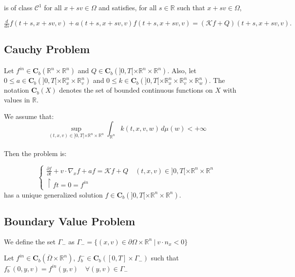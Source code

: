 \documentclass[onecolumn, 12pt, a4paper]{article}
\begin{document}
	is of class $\mathcal{C}^1$ for all $x+sv \in \Omega$ and satisfies, for all $s \in \mathbb{R}$ such that $x +sv \in \Omega$,
	
	$\frac{d}{ds}f(t+s,x+sv,v) +a(t+s,x+sv,v)f(t+s,x+sv,v) = (\mathcal{K}f+ Q)(t+s,x+sv,v).$
	
	\subsection{Cauchy Problem}
	\paragraph{}
	
	
	
	Let $f^{in} \in \mathbf{C}_b(\mathbb{R}^n \times \mathbb{R}^n)$ and $Q \in \mathbf{C}_b(]0,T[ \times \mathbb{R}^n \times \mathbb{R}^n)$. Also, let $0 \leq a \in \mathbf{C}_b(]0,T[ \times \mathbb{R}_x^n \times \mathbb{R}_v^n)$ and $0 \leq k \in \mathbf{C}_b(]0,T[ \times \mathbb{R}_x^n \times \mathbb{R}_v^n \times \mathbb{R}_w^n)$. The notation $\mathbf{C}_b(X)$ denotes the set of bounded continuous functions on $X$ with values in $\mathbb{R}$.
	
	
	We assume that:  \[ \underset{(t,x,v) \in ]0,T[ \times \mathbb{R}^n \times \mathbb{R}^n}{\sup} \int_{\mathbb{R}^n} k(t,x,v,w) \, d\mu(w) < +\infty \]
	
	\paragraph{}
	
	Then the problem is:
	
	\[
	\begin{cases}
		\frac{\partial f}{\partial t}+v \cdot \nabla_x f +af =   \mathcal{K} f +Q \quad (t,x,v) \in ]0,T[ \times \mathbb{R}^n \times \mathbb{R}^n\\
		\restriction{f}{t=0}= f^{in}
	\end{cases}
	\]
	has a unique generalized solution $f \in \mathbf{C}_b(]0,T[ \times \mathbb{R}^n \times \mathbb{R}^n)$.
	
	\subsection{Boundary Value Problem}
	
	We define the set $\Gamma_-$ as $\Gamma_-= \{(x,v) \in \partial \Omega \times \mathbb{R}^n ~ | ~ v\cdot n_x<0\}$
	
	Let $f^{in} \in \mathbf{C}_b(\overline{\Omega} \times \mathbb{R}^n)$, $f_b^- \in \mathbf{C}_b([0,T] \times \Gamma_-)$ such that $f_b^-(0,y,v)=f^{in}(y,v) \quad \forall (y,v) \in \Gamma_-$
	
\end{document}
